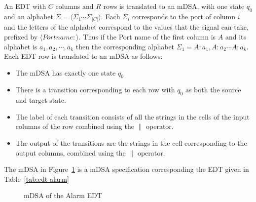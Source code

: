 An EDT with $C$ columns and $R$ rows is translated to an mDSA, with one
state $q_0$ and an alphabet $\Sigma = \langle \Sigma_1 \cdots \Sigma_{|C|} \rangle$.
Each $\Sigma_i$ corresponds to the port of column $i$ and the
letters of the alphabet correspond to the values that the signal can take,
prefixed by $\langle Portname: \rangle$. 
Thus if the Port name of the first
column is $A$ and its alphabet is ${ a_1, a_2, \cdots, a_k}$ then the
corresponding alphabet $\Sigma_1 = {A:a_1, A:a_2 \cdots A:a_k}$. 
Each EDT row is translated to an mDSA as follows:
\begin{itemize}
\item The mDSA has exactly one state $q_0$
\item
There is a transition corresponding to each row with $q_0$ as both the source and target state. 
\item
The label of each transition consists of all the strings in the cells of the input columns of the row combined using the $\parallel$ operator.
\item 
The output of the transitions are the strings in the cell corresponding to the output columns, combined using the $\parallel$ operator.
\end{itemize}

The mDSA in Figure~\ref{fig:state-diagram} is a mDSA specification corresponding the EDT given in Table~\ref{tab:edt-alarm}

\begin{figure}[htbp]
    \centering
{}
\caption{mDSA of the Alarm EDT}
    \label{fig:state-diagram}
\end{figure}

